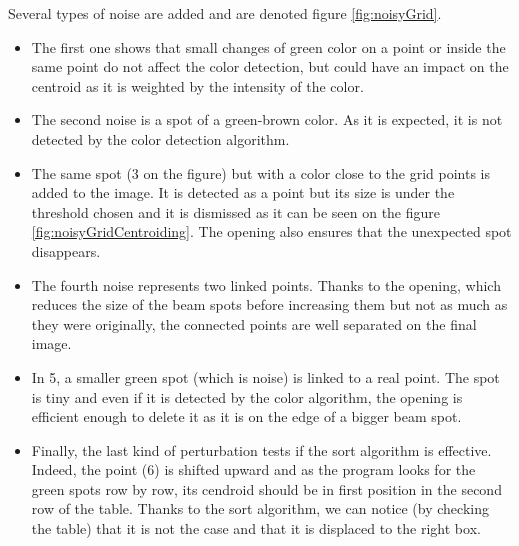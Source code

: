 Several types of noise are added and are denoted figure \ref{fig:noisyGrid}. 
\begin{itemize}
\item The first one shows that small changes of green color on a point or inside the same point do not affect the color detection, but could have an impact on the centroid as it is weighted by the intensity of the color. 
\item The second noise is a spot of a green-brown color. As it is expected, it is not detected by the color detection algorithm. 
\item The same spot (3 on the figure) but with a color close to the grid points is added to the image. It is detected as a point but its size is under the threshold chosen and it is dismissed as it can be seen on the figure \ref{fig:noisyGridCentroiding}. The opening also ensures that the unexpected spot disappears. 
\item The fourth noise represents two linked points. Thanks to the opening, which reduces the size of the beam spots before increasing them but not as much as they were originally, the connected points are well separated on the final image.
\item In 5, a smaller green spot (which is noise) is linked to a real point. The spot is tiny and even if it is detected by the color algorithm, the opening is efficient enough to delete it as it is on the edge of a bigger beam spot.
\item Finally, the last kind of perturbation tests if the sort algorithm is effective. Indeed, the point (6) is shifted upward and as the program looks for the green spots row by row, its cendroid should be in first position in the second row of the table. Thanks to the sort algorithm, we can notice (by checking the table) that it is not the case and that it is displaced to the right box. 
\end{itemize}

